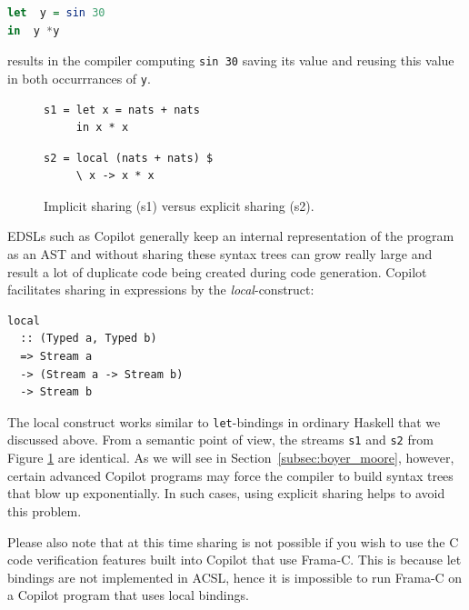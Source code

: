 \begin{lstlisting}[language = Haskell, frame = none]
let  y = sin 30 
in  y *y  
\end{lstlisting}

results in the compiler computing {\tt sin 30} saving its value and
reusing this value in both occurrrances of {\tt y}. 

\begin{figure}[!htb]
\begin{minipage}{0.5\textwidth}
\begin{lstlisting}[language = Copilot, frame = none]
s1 = let x = nats + nats
     in x * x
\end{lstlisting}
\end{minipage}
\begin{minipage}{0.5\textwidth}
\begin{lstlisting}[language = Copilot, frame = none]
s2 = local (nats + nats) $
     \ x -> x * x
\end{lstlisting} 
\end{minipage}
\caption{Implicit sharing (s1) versus explicit sharing (s2).}
\label{fig:explicit_sharing}
\end{figure}

\noindent  EDSLs such as Copilot 
generally keep an 
internal representation of the program as an AST and  without sharing
these syntax trees can grow really large and result a lot of duplicate
code being created during code generation. 
Copilot facilitates sharing in expressions by the \emph{local}-construct:
%
\begin{lstlisting}[language = Copilot, frame = single]
local
  :: (Typed a, Typed b)
  => Stream a
  -> (Stream a -> Stream b)
  -> Stream b
\end{lstlisting}
%
The  local construct works similar to {\tt let}-bindings in ordinary
Haskell that we discussed above.
From a semantic point of view, the streams {\tt s1} and {\tt s2} from Figure
\ref{fig:explicit_sharing} are identical.
As we will see in Section~\ref{subsec:boyer_moore}, however, certain advanced
Copilot programs may force the compiler to build syntax trees that
blow up exponentially.
In such cases, using explicit sharing helps to avoid this problem.

Please also note that at this time sharing is not possible if you wish
to use  the C code verification
features  built into Copilot that use Frama-C. This is because  let bindings are not implemented in ACSL, hence it is
impossible to run Frama-C on a Copilot program that uses local bindings.

